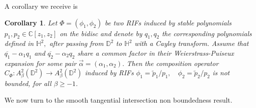 \documentclass[12pt]{amsart}
\newtheorem{corollary}[theorem]{Corollary}
\numberwithin{equation}{section}
\begin{document}
A corollary we receive is
\begin{corollary} Let $\Phi=(\phi_1,\phi_2)$ be two RIFs induced by stable polynomials $p_1,p_2\in\mathbb{C}[z_1,z_2]$ on the bidisc and denote by $q_1,q_2$ the corresponding polynomials defined in $\mathbb{H}^2,$ after passing from $\mathbb{D}^2$ to $\mathbb{H}^2$ with a Cayley transform. Assume that $\overline{q_1}-\alpha_1q_1$ and $\overline{q_2}-\alpha_2q_2$ share a common factor in their Weierstrass-Puiseux expansion for some pair $\vec{\alpha}=(\alpha_1,\alpha_2).$ Then the composition operator $C_{\Phi}:A^2_{\beta}(\mathbb{D}^2)\to A^2_{\beta}(\mathbb{D}^2)$ induced by RIFs $\phi_1=\widetilde{p}_1/p_1,\quad \phi_2=\widetilde{p}_2/p_2$ is not bounded, for all $\beta\ge-1$.
\end{corollary}
We now turn to the smooth tangential intersection non boundedness result.
\end{document}
